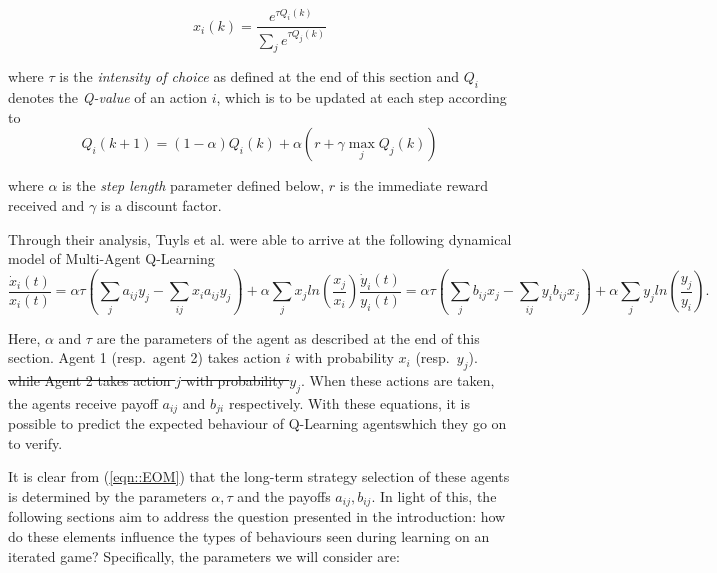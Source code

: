 \documentclass[sigconf]{aamas}
\begin{document}
\begin{equation}
    x_i(k) = \frac{e^{\tau Q_i(k)}}{\sum_j e^{\tau Q_j(k)}}
\end{equation}

where $\tau$ is the \textit{intensity of choice} as defined at the end of this section and $Q_i$ denotes the \textit{Q-value} of an action $i$, which is to be updated at each step according to
%
\begin{equation}
\label{eqn::Qupdate}
    Q_i(k+1) = (1 - \alpha) Q_i(k) + \alpha (r + \gamma \max_j Q_j(k))
\end{equation}

where $\alpha$ is the \textit{step length} parameter defined below, $r$ is the immediate reward received and $\gamma$ is a discount factor.

Through their analysis, Tuyls et al. were able to
arrive at the following dynamical model of Multi-Agent Q-Learning
%
\begin{subequations}
\label{eqn::EOM}
    \begin{equation}
        \frac{\dot{x}_i(t)}{x_i(t)} = \alpha \tau (\sum_{j} a_{ij} y_j - \sum_{i j} x_i a_{ij} y_j)
        + \alpha \sum_j x_j ln(\frac{x_j}{x_i}) 
    \end{equation}
    \begin{equation}
        \frac{\dot{y}_i(t)}{y_i(t)} = \alpha \tau (\sum_{j} b_{ij} x_j - \sum_{i j} y_i b_{ij} x_j)
        + \alpha \sum_j y_j ln(\frac{y_j}{y_i}).
    \end{equation}
\end{subequations}

Here, $\alpha$ and $\tau$ are the parameters of the agent as described at the end of this section. Agent 1 (resp.~agent 2) takes action $i$ with probability
$x_i$ (resp.~$y_j$).
\st{while Agent 2 takes action $j$ with probability $y_j$}. When these actions are taken, the agents
receive payoff $a_{ij}$ and $b_{ji}$ respectively. With these equations, it is possible to
predict the expected behaviour of Q-Learning agentswhich they go on to verify.

It is clear from (\ref{eqn::EOM}) that the long-term strategy selection of
these agents is determined by the parameters $\alpha, \tau$ and the payoffs $a_{ij}, b_{ij}$. In light of this, the following sections aim to address the question presented in the introduction: how do these elements influence the types of behaviours seen during
learning on an iterated game? Specifically, the parameters we will consider are:
\end{document}
